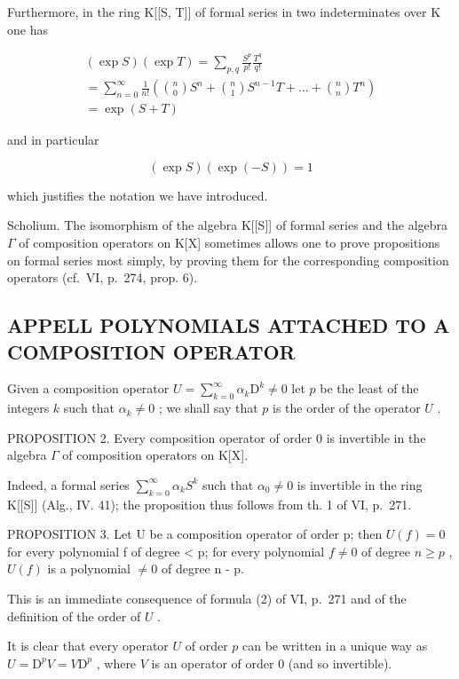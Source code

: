 Furthermore, in the ring K{[}{[}S, T{]}{]} of formal series in two indeterminates over K one has

\[
\begin{array}{l} (\exp S) (\exp T) = \sum_ {p, q} \frac {S ^ {p}}{p !} \frac {T ^ {q}}{q !} \\ = \sum_ {n = 0} ^ {\infty} \frac {1}{n !} \left(\binom {n} {0} S ^ {n} + \binom {n} {1} S ^ {n - 1} T + \dots + \binom {n} {n} T ^ {n}\right) \\ = \exp (S + T) \end{array}\tag{4}
\]

and in particular

\[
(\exp S) (\exp (- S)) = 1\tag{5}
\]

which justifies the notation we have introduced.

Scholium. The isomorphism of the algebra K{[}{[}S{]}{]} of formal series and the algebra \(\Gamma\) of composition operators on K{[}X{]} sometimes allows one to prove propositions on formal series most simply, by proving them for the corresponding composition operators (cf.~VI, p.~274, prop. 6).

\subsection{APPELL POLYNOMIALS ATTACHED TO A COMPOSITION OPERATOR}

Given a composition operator \(U = \sum_{k=0}^{\infty} \alpha_k \mathrm{D}^k \neq 0\) let \(p\) be the least of the integers \(k\) such that \(\alpha_k \neq 0\) ; we shall say that \(p\) is the order of the operator \(U\) .

PROPOSITION 2. Every composition operator of order 0 is invertible in the algebra \(\Gamma\) of composition operators on K{[}X{]}.

Indeed, a formal series \(\sum_{k=0}^{\infty}\alpha_{k}S^{k}\) such that \(\alpha_{0}\neq0\) is invertible in the ring K{[}{[}S{]}{]} (Alg., IV. 41); the proposition thus follows from th. 1 of VI, p.~271.

PROPOSITION 3. Let U be a composition operator of order p; then \(U(f) = 0\) for every polynomial f of degree \textless{} p; for every polynomial \(f \neq 0\) of degree \(n \geqslant p\) , \(U(f)\) is a polynomial \(\neq 0\) of degree n - p.

This is an immediate consequence of formula (2) of VI, p.~271 and of the definition of the order of \(U\) .

It is clear that every operator \(U\) of order \(p\) can be written in a unique way as \(U = \mathrm{D}^p V = V\mathrm{D}^p\) , where \(V\) is an operator of order 0 (and so invertible).

